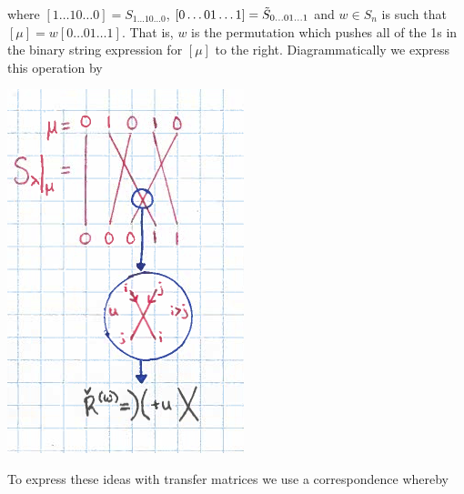 \documentclass[12pt]{amsart}
\numberwithin{equation}{section}
\theoremstyle{definition}
\numberwithin{figure}{section}
\begin{document}
where $[1\dots 10\dots 0]=S_{1\dots 10\dots 0}$, $[0\dots01\dots 1]=\Tilde{S}_{0\dots01\dots1}$ and $w\in S_n$ is such that $[\mu]=w[0\dots01\dots1]$. That is, $w$ is the permutation which pushes all of the 1s in the binary string expression for $[\mu]$ to the right. Diagrammatically we express this operation by
\begin{center}
	\includegraphics[scale=0.75]{lecture_diagrams_cropped_2.png}
\end{center}
To express these ideas with transfer matrices we use a correspondence whereby
\end{document}
